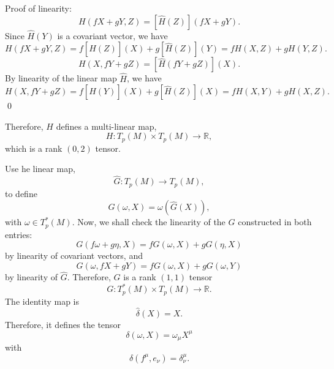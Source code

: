 \begin{solution}
    Proof of linearity:
    \begin{equation}
        H(fX+gY,Z) = [\hat{H}(Z)](fX+gY).
    \end{equation}
    Since $\hat{H}(Y)$ is a covariant vector, we have
    \begin{equation}
        H(fX+gY,Z) =f[\hat{H}(Z)](X) + g[\hat{H}(Z)](Y) = fH(X,Z) + gH(Y,Z).
    \end{equation}
    \begin{equation}
        H(X,fY+gZ) = [\hat{H}(fY+gZ)](X).
    \end{equation}
    By linearity of the linear map $\hat{H}$, we have
    \begin{equation}
        H(X,fY+gZ)  = f[\hat{H}(Y)](X) + g[\hat{H}(Z)](X) = fH(X,Y)+gH(X,Z).
    \end{equation}
    \qed
    
    Therefore, $H$ defines a multi-linear map,
    \begin{equation}
        H: T_p(M)\times T_p(M) \to \mathbb{R},
    \end{equation}
    which is a rank $(0,2)$ tensor.

    Use he linear map,
    \begin{equation}
        \hat{G}: T_p(M) \to T_p(M),
    \end{equation}
    to define 
    \begin{equation}
        G(\omega,X) = \omega(\hat{G}(X)),
    \end{equation}
    with $\omega\in T_p^*(M)$. Now, we shall check the linearity of the $G$ constructed in both entries:
    \begin{equation}
        G(f\omega+g\eta,X) = fG(\omega,X) +gG(\eta,X)
    \end{equation}
    by linearity of covariant vectors, and
    \begin{equation}
        G(\omega,fX+gY) = fG(\omega,X) +gG(\omega,Y)
    \end{equation}
    by linearity of $\hat{G}$.
    Therefore, $G$ is a rank $(1,1)$ tensor
    \begin{equation}
        G:T_p^*(M)\times T_p(M) \to \mathbb{R}.
    \end{equation}
    The identity map is
    \begin{equation}
        \hat{\delta}(X) = X.
    \end{equation}
    Therefore, it defines the tensor
    \begin{equation}
        \delta(\omega, X) = \omega_\mu X^\mu
    \end{equation}
    with
    \begin{equation}
        \delta(f^\mu, e_\nu) = \delta^\mu_\nu.
    \end{equation}

\end{solution}
